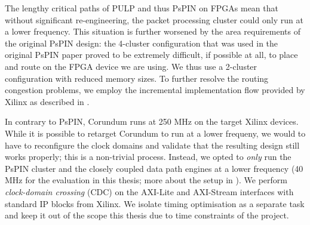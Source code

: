 The lengthy critical paths of PULP and thus PsPIN on FPGAs mean that without significant re-engineering, the packet processing cluster could only run at a lower frequency.  This situation is further worsened by the area requirements of the original PsPIN design: the 4-cluster configuration that was used in the original PsPIN paper proved to be extremely difficult, if possible at all, to place and route on the FPGA device we are using.  We thus use a 2-cluster configuration with reduced memory sizes.  To further resolve the routing congestion problems, we employ the incremental implementation flow provided by Xilinx as described in .

In contrary to PsPIN, Corundum runs at 250 MHz on the target Xilinx devices.  While it is possible to retarget Corundum to run at a lower frequeny, we would to have to reconfigure the clock domains and validate that the resulting design still works properly; this is a non-trivial process.  Instead, we opted to \emph{only} run the PsPIN cluster and the closely coupled data path engines at a lower frequency (40 MHz for the evaluation in this thesis; more about the setup in ).  We perform \emph{clock-domain crossing} (CDC) on the AXI-Lite and AXI-Stream interfaces with standard IP blocks from Xilinx.  We isolate timing optimisation as a separate task and keep it out of the scope this thesis due to time constraints of the project.
